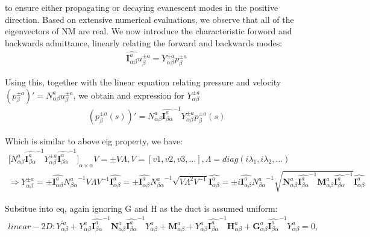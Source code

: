 \documentclass{Note}
\begin{document}
to ensure either propagating or decaying evanescent modes in the positive direction. Based on extensive numerical evaluations, we observe that all of the eigenvectors of NM are real. We now introduce the characteristic forword and backwards admittance, linearly relating the forward and backwards modes:
\begin{equation}
\begin{aligned}
\widehat{\textbf{I}_{\alpha\beta}^{ a}}  u_{\beta}^{\pm a}=Y_{\alpha\beta}^{\pm a} p_{\beta}^{\pm a}
\end{aligned}
\end{equation}

Using this, together with the linear equation relating pressure and velocity  $(p_{\beta}^{\pm a})'=N_{\alpha\beta}^a u_{\beta}^{\pm a}$, we obtain and expression for $Y_{\alpha\beta}^{\pm a}$
\begin{equation}
\begin{aligned}
(p_{\beta}^{\pm a}(s))'=N_{\alpha\beta}^a {\widehat{\textbf{I}_{\beta \alpha}^a}}^{-1}  Y_{\alpha\beta}^{\pm a} p_{\beta}^{\pm a}(s)
\end{aligned}
\end{equation}


Which is similar to above eig property, we have:
\begin{equation}
\begin{aligned}
{\lbrack N_{\alpha\beta}^a {\widehat{\textbf{I}_{\beta \alpha}^a}}^{-1}  Y_{\alpha\beta}^{\pm a}  {\widehat{\textbf{I}_{\beta \alpha}^a}^{-1}} \rbrack }_{\alpha\times\alpha} V=\pm V\Lambda,V=[v1,v2,v3,...],\Lambda=diag(i\lambda_1,i\lambda_2,...)\\
\Rightarrow   Y_{\alpha\beta}^{\pm a}=\pm   {\widehat{\textbf{I}_{ \alpha \beta}^a}} {N_{\beta \alpha}^a}^{-1} V\Lambda V^{-1}{\widehat{\textbf{I}_{ \alpha \beta}^a}}=\pm {\widehat{\textbf{I}_{ \alpha \beta}^a}} {N_{\beta \alpha}^a}^{-1} \sqrt{V\Lambda^2 V^{-1}}{\widehat{\textbf{I}_{ \alpha \beta}^a}}=\pm i {\widehat{\textbf{I}_{ \alpha \beta}^a}} {N_{\beta \alpha}^a}^{-1} \sqrt{ \textbf{N}_{\alpha\beta}^a  {\widehat{\textbf{I}_{\beta \alpha}^a}}^{-1} \textbf{M}_{\alpha\beta}^a{\widehat{\textbf{I}_{\beta \alpha}^a}}^{-1}}{\widehat{\textbf{I}_{ \alpha \beta}^a}}
\end{aligned}
\end{equation}

Subsitue into eq, again ignoring G and H as the duct is assumed uniform:
\begin{equation}
\begin{aligned}
linear-2D:{Y}_{\alpha\beta}^{'a} +Y_{\alpha\beta}^{a} {\widehat{\textbf{I}_{\beta \alpha}^a}}^{-1}   \textbf{N}_{\alpha\beta}^a {\widehat{\textbf{I}_{\beta \alpha}^a}}^{-1}  Y_{\alpha\beta}^a +\textbf{M}_{\alpha\beta}^a +Y_{\alpha\beta}^{a} {\widehat{\textbf{I}_{\beta \alpha}^a}}^{-1}  \textbf{H}_{\alpha\beta}^a + \textbf{G}_{\alpha\beta}^a  {\widehat{\textbf{I}_{\beta \alpha}^a}}^{-1}  Y_{\alpha\beta}^a =0,
\end{aligned}
\end{equation}
\end{document}
